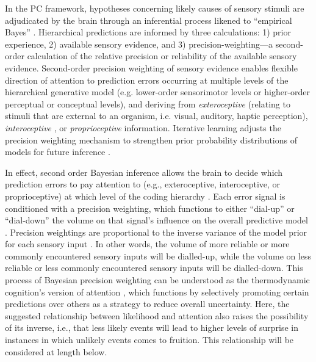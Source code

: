 \begin{CJK}{UTF8}{gbsn}
In the PC framework, hypotheses concerning likely causes of sensory stimuli are adjudicated by the brain through an inferential process likened to ``empirical Bayes'' \citep{Clark2013}.  Hierarchical predictions are informed by three calculations: 1) prior experience, 2) available sensory evidence, and 3) precision-weighting---a second-order calculation of the relative precision or reliability of the available sensory evidence.  Second-order precision weighting of sensory evidence enables flexible direction of attention to prediction errors occurring at multiple levels of the hierarchical generative model (e.g. lower-order sensorimotor levels or higher-order perceptual or conceptual levels), and deriving from \textit{exteroceptive} (relating to stimuli that are external to an organism, i.e. visual, auditory, haptic perception), \textit{interoceptive} \citep[relating to stimuli produced within an organism, particularly by the body's organs (viscera) e.g., ``gut feelings,'' or elevated heart rate; see][]{Seth2013,FeldmanBarrett2015}, or \textit{proprioceptive} \citep[relating to stimuli that are produced and perceived within an organism, especially those connected with the position and movement of the body][]{Friston2011a} information.  Iterative learning adjusts the precision weighting mechanism to strengthen prior probability distributions of models for future inference \citep{Robbins1964}.

In effect, second order Bayesian inference allows the brain to decide which prediction errors to pay attention to (e.g., exteroceptive, interoceptive, or proprioceptive) at which level of the coding hierarchy \citep[for example, higher conceptual errors or lower sensorimotor errors][]{Friston2015}.  Each error signal is conditioned with a precision weighting, which functions to either ``dial-up'' or ``dial-down'' the volume on that signal's influence on the overall predictive model \citep{Clark2015}.  Precision weightings are proportional to the inverse variance of the model prior for each sensory input \citep{Ernst2004,FitzGerald2014}.  In other words, the volume of more reliable or more commonly encountered sensory inputs will be dialled-up, while the volume on less reliable or less commonly encountered sensory inputs will be dialled-down. This process of Bayesian precision weighting can be understood as the thermodynamic cognition's version of attention \citep{Ramstead2016}, which functions by selectively promoting certain predictions over others as a strategy to reduce overall uncertainty.  Here, the suggested relationship between likelihood and attention also raises the possibility of its inverse, i.e., that less likely events will lead to higher levels of surprise in instances in which unlikely events comes to fruition.  This relationship will be considered at length below.


\end{CJK}
